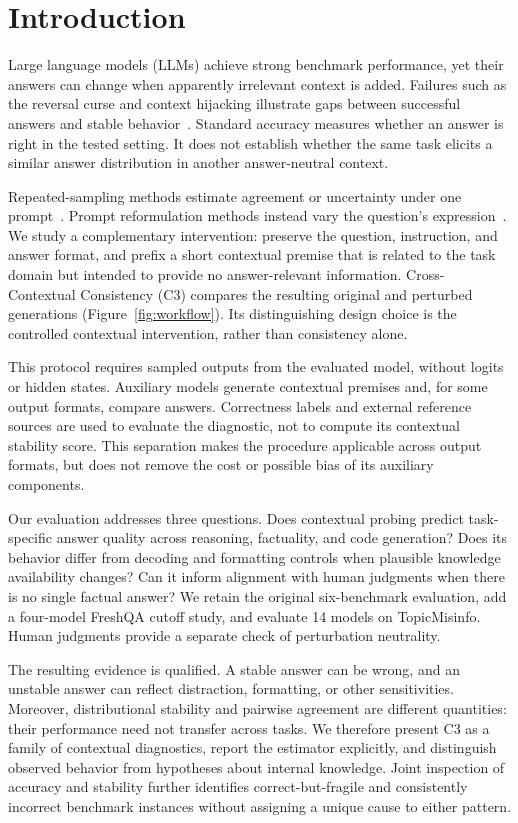 \documentclass[11pt]{article}
\theoremstyle{plain}
\theoremstyle{definition}
\theoremstyle{remark}
\newif\ifrevisionmarkup
\DeclareRobustCommand{\revisioncolor}{\ifrevisionmarkup\color{red}\fi}
\newenvironment{revision}{\par\begingroup\revisioncolor}{\par\endgroup}
\begin{document}
\begin{revision}
\section{Introduction}
Large language models (LLMs) achieve strong benchmark performance, yet their answers can change when apparently irrelevant context is added. Failures such as the reversal curse and context hijacking illustrate gaps between successful answers and stable behavior~\citep{berglund2024the,jiang2024llms}. Standard accuracy measures whether an answer is right in the tested setting. It does not establish whether the same task elicits a similar answer distribution in another answer-neutral context.

Repeated-sampling methods estimate agreement or uncertainty under one prompt~\citep{DBLP:conf/iclr/0002WSLCNCZ23,kuhn2023semantic}. Prompt reformulation methods instead vary the question's expression~\citep{portillo-wightman-etal-2023-strength,chen-etal-2024-self-para}. We study a complementary intervention: preserve the question, instruction, and answer format, and prefix a short contextual premise that is related to the task domain but intended to provide no answer-relevant information. Cross-Contextual Consistency (C3) compares the resulting original and perturbed generations (Figure~\ref{fig:workflow}). Its distinguishing design choice is the controlled contextual intervention, rather than consistency alone.

This protocol requires sampled outputs from the evaluated model, without logits or hidden states. Auxiliary models generate contextual premises and, for some output formats, compare answers. Correctness labels and external reference sources are used to evaluate the diagnostic, not to compute its contextual stability score. This separation makes the procedure applicable across output formats, but does not remove the cost or possible bias of its auxiliary components.

Our evaluation addresses three questions. Does contextual probing predict task-specific answer quality across reasoning, factuality, and code generation? Does its behavior differ from decoding and formatting controls when plausible knowledge availability changes? Can it inform alignment with human judgments when there is no single factual answer? We retain the original six-benchmark evaluation, add a four-model FreshQA cutoff study, and evaluate 14 models on TopicMisinfo. Human judgments provide a separate check of perturbation neutrality.

The resulting evidence is qualified. A stable answer can be wrong, and an unstable answer can reflect distraction, formatting, or other sensitivities. Moreover, distributional stability and pairwise agreement are different quantities: their performance need not transfer across tasks. We therefore present C3 as a family of contextual diagnostics, report the estimator explicitly, and distinguish observed behavior from hypotheses about internal knowledge. Joint inspection of accuracy and stability further identifies correct-but-fragile and consistently incorrect benchmark instances without assigning a unique cause to either pattern.
\end{revision}
\end{document}
